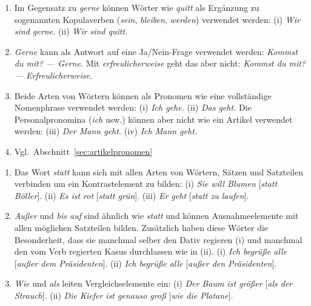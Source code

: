 
\begin{sloppypar}

\begin{enumerate}\Lf
  \item Im Gegensatz zu \textit{gerne} können Wörter wie \textit{quitt} als Ergänzung zu sogenannten Kopulaverben (\textit{sein}, \textit{bleiben}, \textit{werden}) verwendet werden:
    (i) \Ast \textit{Wir sind gerne.} (ii) \textit{Wir sind quitt.}
  \item \textit{Gerne} kann als Antwort auf eine Ja\slash Nein-Frage verwendet werden:
    \textit{Kommst du mit? --- Gerne.}
    Mit \textit{erfreulicherweise} geht das aber nicht:
    \textit{Kommst du mit? --- \Ast Erfreulicherweise.}
  \item Beide Arten von Wörtern können als Pronomen wie eine vollständige Nomenphrase verwendet werden:
    (i) \textit{Ich gehe.}
    (ii) \textit{Das geht.}
    Die Personalpronomina (\textit{ich} usw.) können aber nicht wie ein Artikel verwendet werden:
    (iii) \textit{Der Mann geht.}
    (iv) \Ast \textit{Ich Mann geht.}
  \item Vgl.\ Abschnitt~\ref{sec:artikelpronomen}
\end{enumerate}

\end{sloppypar}


\begin{enumerate}\Lf
  \item Das Wort \textit{statt} kann sich mit allen Arten von Wörtern, Sätzen und Satzteilen verbinden um ein Kontrastelement zu bilden:
    (i) \textit{Sie will Blumen} [\textit{statt Böller}].
    (ii) \textit{Es ist rot} [\textit{statt grün}].
    (iii) \textit{Er geht} [\textit{statt zu laufen}]. 
  \item \textit{Außer} und \textit{bis auf} sind ähnlich wie \textit{statt} und können Ausnahmeelemente mit allen möglichen Satzteilen bilden.
    Zusätzlich haben diese Wörter die Besonderheit, dass sie manchmal selber den Dativ regieren (i) und manchmal den vom Verb regierten Kasus durchlassen wie in (ii).
    (i) \textit{Ich begrüße alle} [\textit{außer dem Präsidenten}].
    (ii) \textit{Ich begrüße alle} [\textit{außer den Präsidenten}].
  \item \textit{Wie} und \textit{als} leiten Vergleichselemente ein:
    (i) \textit{Der Baum ist größer} [\textit{als der Strauch}].
    (ii) \textit{Die Kiefer ist genauso groß} [\textit{wie die Platane}].
\end{enumerate}

